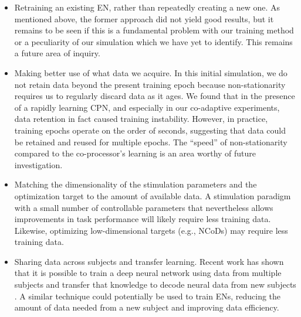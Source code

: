 \documentclass[12pt]{iopart}
\begin{document}
\begin{itemize}
	\item Retraining an existing EN, rather than repeatedly creating a new one. As
	      mentioned above, the former approach did not yield good results, but it remains
	      to be seen if this is a fundamental problem with our training method or
	    a peculiarity of our simulation which we have yet to identify. This
	      remains a future area of inquiry.
	\item Making better use of what data we acquire. In this initial simulation, we do
	      not retain data beyond the present training epoch because non-stationarity requires us to
	      regularly discard data as it ages. We found that in the presence
	      of a rapidly learning CPN, and especially in our co-adaptive experiments,
	      data retention in fact caused training instability. However, in
	      practice, training epochs operate on the order of seconds, suggesting
	      that data could be retained and reused for multiple epochs. The ``speed'' of 
	      non-stationarity compared to the co-processor's learning is an
	      area worthy of future investigation.
	\item Matching the dimensionality of the stimulation parameters and the optimization
        target to the amount of available data. A stimulation paradigm with
	      a small number of controllable parameters that nevertheless allows
	      improvements in task performance will likely require less training data. Likewise,
        optimizing low-dimensional targets (e.g., NCoDs) may require less training
        data.  
    \item Sharing data across subjects and transfer learning. Recent work has shown that
        it is possible to train a deep neural network using data from multiple subjects and
        transfer that knowledge to decode neural data from new subjects \cite{peterson.transfer}.
        A similar technique could potentially be used to train ENs, reducing the amount of
        data needed from a new subject and improving data efficiency.
\end{itemize}
\end{document}

